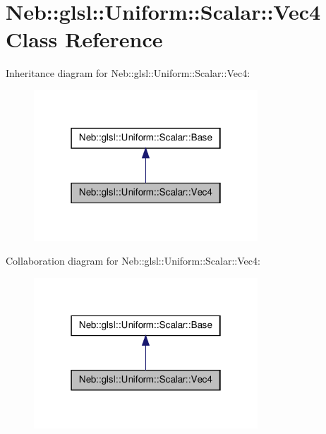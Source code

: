\hypertarget{classNeb_1_1glsl_1_1Uniform_1_1Scalar_1_1Vec4}{\section{\-Neb\-:\-:glsl\-:\-:\-Uniform\-:\-:\-Scalar\-:\-:\-Vec4 \-Class \-Reference}
\label{classNeb_1_1glsl_1_1Uniform_1_1Scalar_1_1Vec4}
}


\-Inheritance diagram for \-Neb\-:\-:glsl\-:\-:\-Uniform\-:\-:\-Scalar\-:\-:\-Vec4\-:\nopagebreak
\begin{figure}[H]
\begin{center}
\leavevmode
\includegraphics[width=238pt]{classNeb_1_1glsl_1_1Uniform_1_1Scalar_1_1Vec4__inherit__graph}
\end{center}
\end{figure}


\-Collaboration diagram for \-Neb\-:\-:glsl\-:\-:\-Uniform\-:\-:\-Scalar\-:\-:\-Vec4\-:\nopagebreak
\begin{figure}[H]
\begin{center}
\leavevmode
\includegraphics[width=238pt]{classNeb_1_1glsl_1_1Uniform_1_1Scalar_1_1Vec4__coll__graph}
\end{center}
\end{figure}
